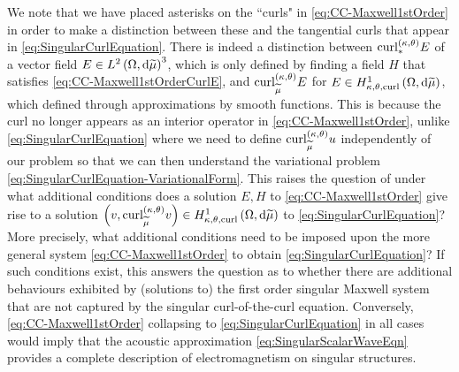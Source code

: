 We note that we have placed asterisks on the ``curls" in \eqref{eq:CC-Maxwell1stOrder} in order to make a distinction between these and the tangential curls that appear in \eqref{eq:SingularCurlEquation}.
There is indeed a distinction between $\mathrm{curl}_{*}^{\left( \kappa, \theta \right)}E$ of a vector field $E\in L^{2}\left( \Omega,\mathrm{d} \widetilde{\mu} \right)^3$, which is only defined by finding a field $H$ that satisfies \eqref{eq:CC-Maxwell1stOrderCurlE}, and $\mathrm{curl}_{\widetilde{\mu}}^{\left( \kappa, \theta \right)}E$ for $E\in H^1_{\kappa,\theta,\mathrm{curl}}\left( \Omega, \mathrm{d}\widetilde{\mu} \right)$, which defined through approximations by smooth functions.
This is because the curl no longer appears as an interior operator in \eqref{eq:CC-Maxwell1stOrder}, unlike \eqref{eq:SingularCurlEquation} where we need to define $\mathrm{curl}_{\widetilde{\mu}}^{\left( \kappa, \theta \right)}u$ independently of our problem so that we can then understand the variational problem \eqref{eq:SingularCurlEquation-VariationalForm}.
This raises the question of under what additional conditions does a solution $E,H$ to \eqref{eq:CC-Maxwell1stOrder} give rise to a solution $\left( v, \mathrm{curl}_{\widetilde{\mu}}^{\left( \kappa, \theta \right)}v  \right)\in H^1_{\kappa,\theta,\mathrm{curl}}\left( \Omega, \mathrm{d}\widetilde{\mu} \right)$ to \eqref{eq:SingularCurlEquation}?
More precisely, what additional conditions need to be imposed upon the more general system \eqref{eq:CC-Maxwell1stOrder} to obtain \eqref{eq:SingularCurlEquation}?
If such conditions exist, this answers the question as to whether there are additional behaviours exhibited by (solutions to) the first order singular Maxwell system that are not captured by the singular curl-of-the-curl equation.
Conversely, \eqref{eq:CC-Maxwell1stOrder} collapsing to \eqref{eq:SingularCurlEquation} in all cases would imply that the acoustic approximation \eqref{eq:SingularScalarWaveEqn} provides a complete description of electromagnetism on singular structures.